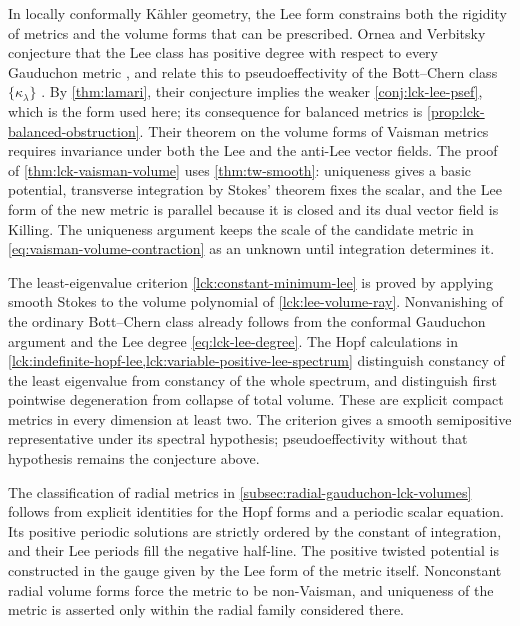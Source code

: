 In locally conformally K\"ahler geometry, the Lee form constrains both the rigidity of metrics and the volume forms that can be prescribed. Ornea and Verbitsky conjecture that the Lee class has positive degree with respect to every Gauduchon metric \cite[Conjecture~4.14, p.~7]{OV25Balanced}, and relate this to pseudoeffectivity of the Bott--Chern class $\{\kappa_\lambda\}$ \cite[Remark~4.16, p.~8]{OV25Balanced}. By \cref{thm:lamari}, their conjecture implies the weaker \cref{conj:lck-lee-psef}, which is the form used here; its consequence for balanced metrics is \cref{prop:lck-balanced-obstruction}. Their theorem on the volume forms of Vaisman metrics \cite[Theorem~4.1 and Lemmas~4.2--4.4]{OV24Vaisman} requires invariance under both the Lee and the anti-Lee vector fields. The proof of \cref{thm:lck-vaisman-volume} uses \cref{thm:tw-smooth}: uniqueness gives a basic potential, transverse integration by Stokes' theorem fixes the scalar, and the Lee form of the new metric is parallel because it is closed and its dual vector field is Killing. The uniqueness argument keeps the scale of the candidate metric in \eqref{eq:vaisman-volume-contraction} as an unknown until integration determines it.

The least-eigenvalue criterion \cref{lck:constant-minimum-lee} is proved by applying smooth Stokes to the volume polynomial of \cref{lck:lee-volume-ray}. Nonvanishing of the ordinary Bott--Chern class already follows from the conformal Gauduchon argument and the Lee degree \eqref{eq:lck-lee-degree}. The Hopf calculations in \cref{lck:indefinite-hopf-lee,lck:variable-positive-lee-spectrum} distinguish constancy of the least eigenvalue from constancy of the whole spectrum, and distinguish first pointwise degeneration from collapse of total volume. These are explicit compact metrics in every dimension at least two. The criterion gives a smooth semipositive representative under its spectral hypothesis; pseudoeffectivity without that hypothesis remains the conjecture above.

The classification of radial metrics in \cref{subsec:radial-gauduchon-lck-volumes} follows from explicit identities for the Hopf forms and a periodic scalar equation. Its positive periodic solutions are strictly ordered by the constant of integration, and their Lee periods fill the negative half-line. The positive twisted potential is constructed in the gauge given by the Lee form of the metric itself. Nonconstant radial volume forms force the metric to be non-Vaisman, and uniqueness of the metric is asserted only within the radial family considered there.

